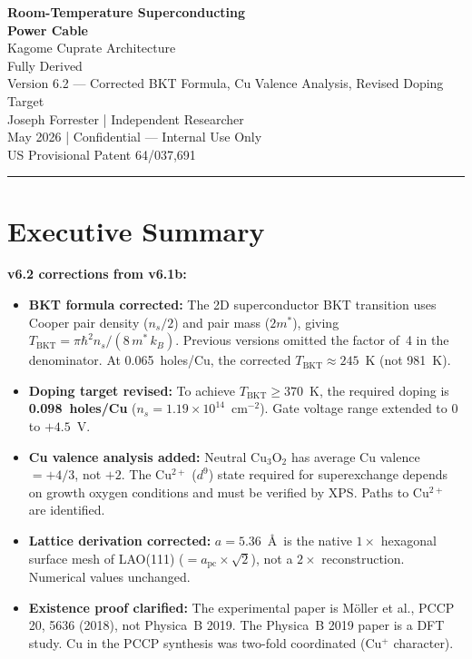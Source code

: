 \documentclass[11pt, a4paper]{article}
\begin{document}
\begin{center}
  {\LARGE \textbf{Room-Temperature Superconducting}}\\[4pt]
  {\LARGE \textbf{Power Cable}}\\[6pt]
  {\large Kagome Cuprate Architecture}\\[4pt]
  {\large Fully Derived}\\[10pt]
  {\color{nm-gray}\small Version 6.2 --- Corrected BKT Formula,
    Cu Valence Analysis, Revised Doping Target}\\[4pt]
  {\color{nm-gray}\small Joseph Forrester \quad|\quad
    Independent Researcher}\\[4pt]
  {\color{nm-gray}\small May 2026 \quad|\quad
    Confidential --- Internal Use Only}\\[4pt]
  {\color{nm-gray}\small US Provisional Patent 64/037,691}
\end{center}

\vspace{1em}\hrule\vspace{1em}

\section*{Executive Summary}

\textbf{v6.2 corrections from v6.1b:}
\begin{itemize}[nosep]
  \item \textbf{BKT formula corrected:} The 2D superconductor
        BKT transition uses Cooper pair density ($n_s/2$) and
        pair mass ($2m^*$), giving
        $T_{\text{BKT}} = \pi\hbar^2 n_s/(8\,m^*\,k_B)$.
        Previous versions omitted the factor of~4 in the
        denominator. At 0.065~holes/Cu, the corrected
        $T_{\text{BKT}} \approx 245$~K (not 981~K).
  \item \textbf{Doping target revised:} To achieve
        $T_{\text{BKT}} \geq 370$~K, the required doping is
        \textbf{0.098~holes/Cu} ($n_s = 1.19 \times 10^{14}$~cm$^{-2}$).
        Gate voltage range extended to $0$ to $+4.5$~V.
  \item \textbf{Cu valence analysis added:} Neutral Cu$_3$O$_2$
        has average Cu valence $= +4/3$, not $+2$. The Cu$^{2+}$
        ($d^9$) state required for superexchange depends on
        growth oxygen conditions and must be verified by XPS.
        Paths to Cu$^{2+}$ are identified.
  \item \textbf{Lattice derivation corrected:} $a = 5.36$~\AA\
        is the native $1\times$ hexagonal surface mesh of
        LAO(111) ($= a_{\text{pc}} \times \sqrt{2}$), not a
        $2\times$ reconstruction. Numerical values unchanged.
  \item \textbf{Existence proof clarified:} The experimental
        paper is M\"oller et al., PCCP 20, 5636 (2018), not
        Physica~B 2019. The Physica~B 2019 paper is a DFT
        study. Cu in the PCCP synthesis was two-fold
        coordinated (Cu$^+$ character).
\end{itemize}
\end{document}
